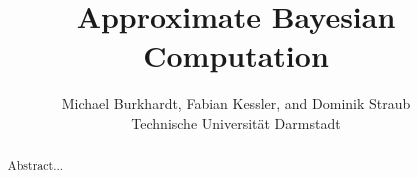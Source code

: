 \documentclass[11pt]{article}
\title{Approximate Bayesian Computation}
\author{Michael Burkhardt, Fabian Kessler, and Dominik Straub \\
	Technische Universität Darmstadt \\}
\begin{document}
	\maketitle
	\begin{abstract}
		Abstract...
	\end{abstract}

	
\end{document}

